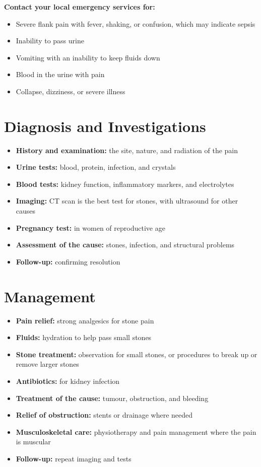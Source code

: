 \textbf{Contact your local emergency services for:}
\begin{itemize}
    \item Severe flank pain with fever, shaking, or confusion, which may indicate sepsis
    \item Inability to pass urine
    \item Vomiting with an inability to keep fluids down
    \item Blood in the urine with pain
    \item Collapse, dizziness, or severe illness
\end{itemize}

\section*{Diagnosis and Investigations}
\begin{itemize}
    \item \textbf{History and examination:} the site, nature, and radiation of the pain
    \item \textbf{Urine tests:} blood, protein, infection, and crystals
    \item \textbf{Blood tests:} kidney function, inflammatory markers, and electrolytes
    \item \textbf{Imaging:} CT scan is the best test for stones, with ultrasound for other causes
    \item \textbf{Pregnancy test:} in women of reproductive age
    \item \textbf{Assessment of the cause:} stones, infection, and structural problems
    \item \textbf{Follow-up:} confirming resolution
\end{itemize}

\section*{Management}
\begin{itemize}
    \item \textbf{Pain relief:} strong analgesics for stone pain
    \item \textbf{Fluids:} hydration to help pass small stones
    \item \textbf{Stone treatment:} observation for small stones, or procedures to break up or remove larger stones
    \item \textbf{Antibiotics:} for kidney infection
    \item \textbf{Treatment of the cause:} tumour, obstruction, and bleeding
    \item \textbf{Relief of obstruction:} stents or drainage where needed
    \item \textbf{Musculoskeletal care:} physiotherapy and pain management where the pain is muscular
    \item \textbf{Follow-up:} repeat imaging and tests
\end{itemize}

